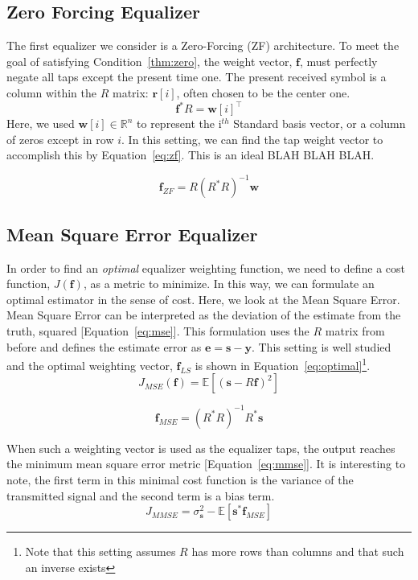 \documentclass[]{article}
\begin{document}
\subsection{Zero Forcing Equalizer}
\label{sec:zf}
The first equalizer we consider is a Zero-Forcing (ZF) architecture.  To meet the goal of satisfying Condition~\ref{thm:zero}, the weight vector, $\mathbf{f}$, must perfectly negate all taps except the present time one.  The present received symbol is a column within the $R$ matrix: $\mathbf{r}[i]$, often chosen to be the center one.  
$$ \mathbf{f}^{\ast}R = \mathbf{w}[i]^{\top} $$
Here, we used  $\mathbf{w} [i] \in \mathbb{R}^n$ to represent the i$^{th}$ Standard basis vector, or a column of zeros except in row $i$.  In this setting, we can find the tap weight vector to accomplish this by Equation~\ref{eq:zf}.  This is an ideal BLAH BLAH BLAH.

\begin{equation}
\label{eq:zf} 
\mathbf{f}_{ZF} = R \left(R^{\ast}R \right)^{-1} \mathbf{w}
\end{equation}

\subsection{Mean Square Error Equalizer}
\label{sec:optimal}
In order to find an \emph{optimal} equalizer weighting function, we need to define a cost function, $J(\mathbf{f})$, as a metric to minimize.  In this way, we can formulate an optimal estimator in the sense of cost.  Here, we look at the Mean Square Error.  Mean Square Error can be interpreted as the deviation of the estimate from the truth, squared [Equation~\ref{eq:mse}].  This formulation uses the $R$ matrix from before and defines the estimate error as $\mathbf{e} = \mathbf{s} - \mathbf{y}$.  This setting is well studied and the optimal weighting vector, $\mathbf{f}_{LS}$ is shown in Equation~\ref{eq:optimal}\footnote{Note that this setting assumes $R$ has more rows than columns and that such an inverse exists}.
\begin{equation}
\label{eq:mse} 
J_{MSE} \left( \mathbf{f}\right) = \mathbb{E} \left[ \left(\mathbf{s} - R \mathbf{f} \right)^2 \right]
\end{equation}

\begin{equation}
\label{eq:optimal}
\mathbf{f}_{MSE} = \left(R^{\ast}R\right)^{-1}R^{\ast}\mathbf{s}
\end{equation}

When such a weighting vector is used as the equalizer taps, the output reaches the minimum mean square error metric  [Equation~\ref{eq:mmse}].  It is interesting to note, the first term in this minimal cost function is the variance of the transmitted signal and the second term is a bias term.
\begin{equation}
\label{eq:mmse}
J_{MMSE} =  \sigma_{\mathbf{s}}^{2} - \mathbb{E} \left[ \mathbf{s}^{\ast} \mathbf{f}_{MSE} \right]
\end{equation}
\end{document}
